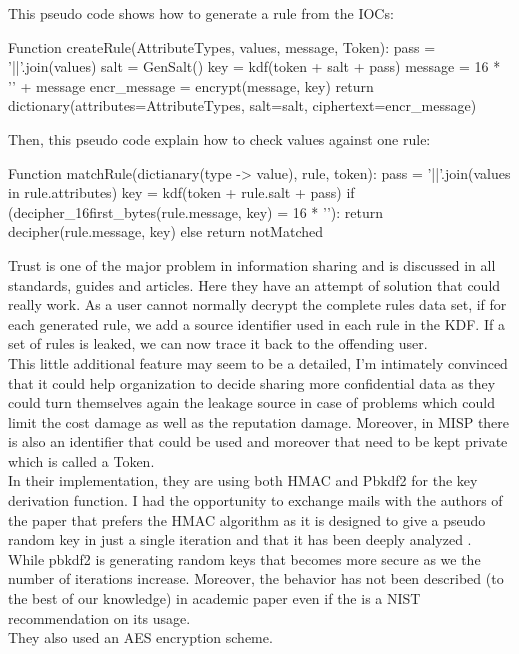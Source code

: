 \documentclass{eplmastersthesis}
\begin{document}
This pseudo code shows how to generate a rule from the IOCs:

\begin{center}
\begin{boxedverbatim}
Function createRule(AttributeTypes, values, message, Token):
        pass = '||'.join(values)
        salt = GenSalt()
        key = kdf(token + salt + pass)
        message = 16 * '' + message
        encr_message = encrypt(message, key)
        return dictionary(attributes=AttributeTypes, 
                            salt=salt,
                            ciphertext=encr_message)
\end{boxedverbatim}
\end{center}

Then, this pseudo code explain how to check values against one rule:
\begin{center}
\begin{boxedverbatim}
Function matchRule(dictianary(type -> value), rule, token):
        pass = '||'.join(values in rule.attributes)
        key = kdf(token + rule.salt + pass)
        if (decipher_16first_bytes(rule.message, key) = 16 * ''):
                return decipher(rule.message, key)
        else
                return notMatched
\end{boxedverbatim}
\end{center}


Trust is one of the major problem in information sharing and is discussed in all standards, guides and articles. Here they have an attempt of solution that could really work. As a user cannot normally decrypt the complete rules data set, if for each generated rule, we add a source identifier used in each rule in the KDF. If a set of rules is leaked, we can now trace it back to the offending user. \\
This little additional feature may seem to be a detailed, I'm intimately convinced that it could help organization to decide sharing more confidential data as they could turn themselves 
again the leakage source in case of problems which could limit the cost damage as well as the reputation damage. Moreover, in MISP there is also an identifier that could be used and moreover that need to be kept private which is called a Token.\\

In their implementation, they are using both HMAC and Pbkdf2 for the key derivation function. I had the opportunity to exchange mails with the authors of the paper that prefers the HMAC algorithm as it is designed to give a pseudo random key in just a single iteration and that it has been deeply analyzed \cite{cryptoeprint}. While pbkdf2 is generating random keys that becomes more secure as we the number of iterations increase. Moreover, the behavior has not been described (to the best of our knowledge) in academic paper even if the is a NIST recommendation on its usage.\\
They also used an AES encryption scheme.\\
\end{document}
